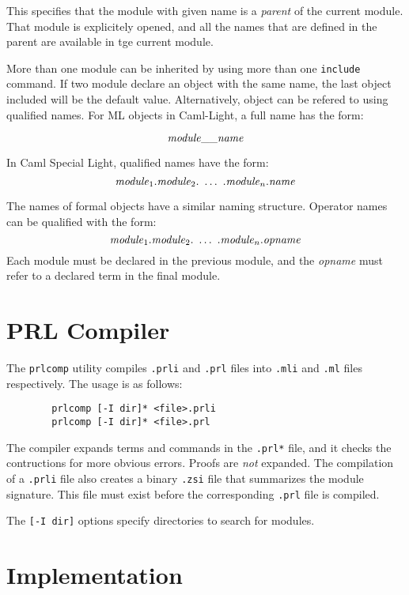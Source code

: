 \documentclass{article}
\begin{document}
This specifies that the module with given name is a {\em parent\/} of the current module.  That
module is explicitely opened, and all the names that are defined in the parent are available in tge
current module.

More than one module can be inherited by using more than one {\tt include} command.  If two module
declare an object with the same name, the last object included will be the default value.
Alternatively, object can be refered to using qualified names.  For ML objects in Caml-Light, a full
name has the form:

$${\it module}{\tt \_\_}{\it name}$$

In Caml Special Light, qualified names have the form:
$$
{\it module}_1 . {\it module}_2 .\ \ldots\ . {\it module}_n . {\it name}
$$

The names of formal objects have a similar naming structure.  Operator names can be qualified with
the form:
$$
{\it module}_1 . {\it module}_2 .\ \ldots\ . {\it module}_n . {\it opname}
$$
Each module must be declared in the previous module, and the {\it opname\/} must refer to a
declared term in the final module.

\section{PRL Compiler}
\label{section:prlcomp}

The {\tt prlcomp} utility compiles {\tt .prli} and {\tt .prl} files into {\tt .mli} and {\tt .ml}
files respectively.  The usage is as follows:

\begin{verbatim}
        prlcomp [-I dir]* <file>.prli
        prlcomp [-I dir]* <file>.prl
\end{verbatim}

The compiler expands terms and commands in the {\tt .prl*} file, and it checks the contructions for
more obvious errors.  Proofs are {\em not\/} expanded.  The compilation of a {\tt .prli} file also
creates a binary {\tt .zsi} file that summarizes the module signature.  This file must exist before
the corresponding {\tt .prl} file is compiled.

The {\tt [-I dir]} options specify directories to search for modules.

\section{Implementation}
\label{section:implementation}
\end{document}
